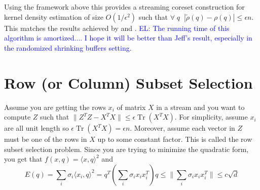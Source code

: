 \documentclass{article} %
\newcommand{\el}[1]{\textcolor{blue}{EL: #1}}
\newcommand{\eps}{\epsilon}
\begin{document}
Using the framework above this provides a streaming coreset construction for kernel density estimation of size $O(1/\eps^2)$ such that 
$\forall \;q\;\; |\tilde \rho(q) - \rho(q)| \le \eps n$.
This matches the results achieved by \cite{DBLP:conf/soda/PhillipsT18} and \cite{DBLP:journals/corr/abs-1802-01751}.
\el{The running time of this algorithm is amortized.... I hope it will be better than Jeff's result, especially in the randomized shrinking buffers setting.}








\section{Row (or Column) Subset Selection}
Assume you are getting the rows $x_i$  of matrix $X$ in a stream and you want to compute $Z$ such that $\|Z^TZ - X^TX\| \le \eps \operatorname{Tr}(X^TX)$.
For simplicity, assume $x_i$ are all unit length so $\eps \operatorname{Tr}(X^TX) = \eps n$. Moreover, assume each vector in $Z$ must be one of the rows in $X$ up to some constant factor.
This is called the row subset selection problem. 
Since you are trying to minimize the quadratic form, you get that $f(x, q) = \langle x,q \rangle ^2$ and 
$$E(q) = \sum_i \sigma_i \langle x_i,q \rangle ^2 = q^T (\sum_i \sigma_i x_i x_i^T ) q \le \|\sum_i \sigma_i x_i x_i^T\| \le c\sqrt{d}$$
\end{document}
